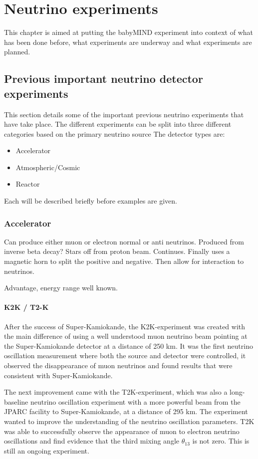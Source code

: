 \chapter{Neutrino  experiments}
\label{c:expIntro}

This chapter is aimed at putting the babyMIND experiment into context of what has been done before, what experiments are underway and what experiments are planned.

\section{Previous important neutrino detector experiments}

This section details some of the important previous neutrino experiments that have take place. The different experiments can be split into three different categories based on the primary neutrino source
The detector types are:
\begin{itemize}
\item Accelerator
\item Atmospheric/Cosmic
\item Reactor
\end{itemize}
Each will be described briefly before examples are given.

\subsection{Accelerator}
Can produce either muon or electron normal or anti neutrinos.
Produced from inverse beta decay? Stars off from proton beam. Continues. Finally uses a magnetic horn to split the positive and negative. Then allow for interaction to neutrinos.

Advantage, energy range well known.

\subsubsection{K2K / T2-K}
After the success of Super-Kamiokande, the K2K-experiment\cite{22K2K} was created with the main difference of using a well understood muon neutrino beam pointing at the Super-Kamiokande detector at a distance of 250 km. It was the first neutrino oscillation measurement where both the source and detector were controlled, it observed the disappearance of muon neutrinos and found results that were consistent with Super-Kamiokande.

The next improvement came with the T2K-experiment\cite{21T2K}, which was also a long-baseline neutrino oscillation experiment with a more powerful beam from the JPARC facility to Super-Kamiokande, at a distance of 295 km. The experiment wanted to improve the understanding of the neutrino oscillation parameters. T2K was able to successfully observe the appearance of muon to electron neutrino oscillations and find evidence that the third mixing angle $\theta_{13}$ is not zero. This is still an ongoing experiment.
